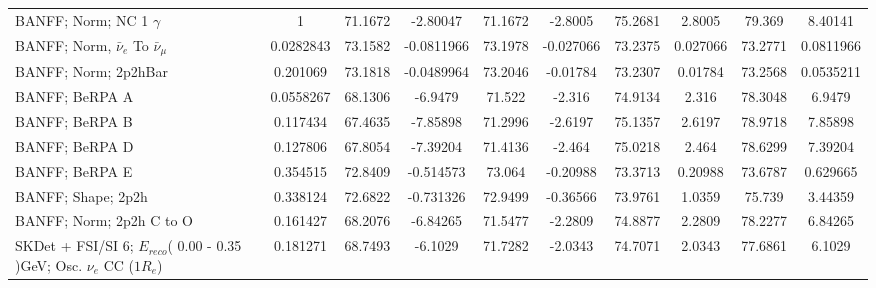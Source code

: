 \begin{tabular}{| l | S | S  S | S  S | S  S | S  S | }
                                                      BANFF; Norm; NC 1 $\gamma$ &               1 &         71.1672 &        -2.80047 &         71.1672 &         -2.8005 &         75.2681 &          2.8005 &          79.369 &         8.40141 \\ 
                               BANFF; Norm, $\bar{\nu}_{e}$ To $\bar{\nu}_{\mu}$ &       0.0282843 &         73.1582 &      -0.0811966 &         73.1978 &       -0.027066 &         73.2375 &        0.027066 &         73.2771 &       0.0811966 \\ 
                                                            BANFF; Norm; 2p2hBar &        0.201069 &         73.1818 &      -0.0489964 &         73.2046 &        -0.01784 &         73.2307 &         0.01784 &         73.2568 &       0.0535211 \\ 
                                                                  BANFF; BeRPA A &       0.0558267 &         68.1306 &         -6.9479 &          71.522 &          -2.316 &         74.9134 &           2.316 &         78.3048 &          6.9479 \\ 
                                                                  BANFF; BeRPA B &        0.117434 &         67.4635 &        -7.85898 &         71.2996 &         -2.6197 &         75.1357 &          2.6197 &         78.9718 &         7.85898 \\ 
                                                                  BANFF; BeRPA D &        0.127806 &         67.8054 &        -7.39204 &         71.4136 &          -2.464 &         75.0218 &           2.464 &         78.6299 &         7.39204 \\ 
                                                                  BANFF; BeRPA E &        0.354515 &         72.8409 &       -0.514573 &          73.064 &        -0.20988 &         73.3713 &         0.20988 &         73.6787 &        0.629665 \\ 
                                                              BANFF; Shape; 2p2h &        0.338124 &         72.6822 &       -0.731326 &         72.9499 &        -0.36566 &         73.9761 &          1.0359 &          75.739 &         3.44359 \\ 
                                                        BANFF; Norm; 2p2h C to O &        0.161427 &         68.2076 &        -6.84265 &         71.5477 &         -2.2809 &         74.8877 &          2.2809 &         78.2277 &         6.84265 \\ 
   SKDet + FSI/SI  6; $E_{reco}$( 0.00 - 0.35 )GeV; Osc. $\nu_{e}$ CC ($1R_{e}$) &        0.181271 &         68.7493 &         -6.1029 &         71.7282 &         -2.0343 &         74.7071 &          2.0343 &         77.6861 &          6.1029 \\ 

\end{tabular}
